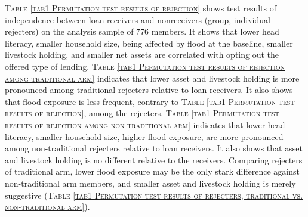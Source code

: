	\textsc{\normalsize Table \ref{tab1 Permutation test results of rejection}} shows test results of independence between loan receivers and nonreceivers (group, individual rejecters) on the analysis sample of 776 members. It shows that lower head literacy, smaller household size, being affected by flood at the baseline, smaller livestock holding, and smaller net assets are correlated with opting out the offered type of lending. \textsc{\normalsize Table \ref{tab1 Permutation test results of rejection among traditional arm}} indicates that lower asset and livestock holding is more pronounced among \textsf{traditional} rejecters relative to loan receivers. It also shows that flood exposure is less frequent, contrary to \textsc{\normalsize Table \ref{tab1 Permutation test results of rejection}}, among the rejecters. \textsc{\normalsize Table \ref{tab1 Permutation test results of rejection among non-traditional arm}} indicates that lower head literacy, smaller household size, higher flood exposure, are more pronounced among non-\textsf{traditional} rejecters relative to loan receivers. It also shows that asset and livestock holding is no different relative to the receivers. Comparing rejecters of \textsf{traditional} arm, lower flood exposure may be the only stark difference against non-\textsf{traditional} arm members, and smaller asset and livestock holding is merely suggestive (\textsc{\normalsize Table \ref{tab1 Permutation test results of rejecters, traditional vs. non-traditional arm}}). 
	
